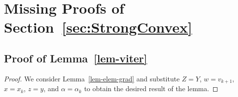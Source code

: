 \documentclass{article}
\def\a{\alpha}
\theoremstyle{plain}
\theoremstyle{definition}
\theoremstyle{remark}
\begin{document}

\section{Missing Proofs of Section~\ref{sec:StrongConvex}}


\subsection{Proof of Lemma~\ref{lem-viter}}\label{lem-viter-proof}

\begin{proof}
    We consider Lemma~\ref{lem-elem-grad} and substitute $Z=Y$, $w=v_{k+1}$, $x=x_k$, $z=y$, and $\a=\a_k$ to obtain the desired result of the lemma.
\end{proof}

\end{document}
